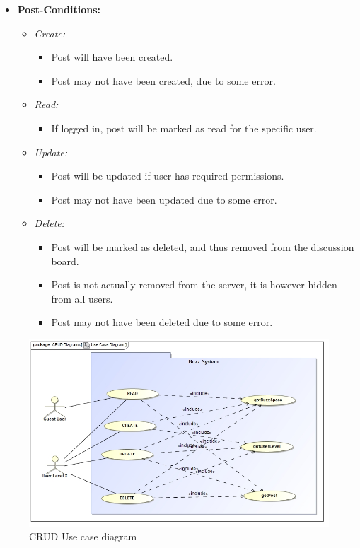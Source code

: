 \documentclass[11pt]{article}
\begin{document}
\begin{enumerate}
\begin{itemize}
\begin{itemize}
		\end{itemize}
		\item \textbf{Post-Conditions: }
		\begin{itemize}
		\item \textit{Create: }
			\begin{itemize}
			\item Post will have been created.
			\item Post may not have been created, due to some error.
			\end{itemize}
		\item \textit{Read: }
			\begin{itemize}
			\item If logged in, post will be marked as read for the 				specific user.
			\end{itemize}
		\item \textit{Update: }
			\begin{itemize}
			\item Post will be updated if user has required 						permissions.
			\item Post may not have been updated due to some error.
			\end{itemize}
		\item \textit{Delete: }
			\begin{itemize}
			\item Post will be marked as deleted, and thus removed 					from the discussion board.
			\item Post is not actually removed from the server, it is 					however hidden from all users.
		\item Post may not have been deleted due to some error. 
			\end{itemize}			
			
		\end{itemize}
	
	\end{itemize}
	
	\begin{figure}[H]	
    	\includegraphics[scale=0.5]{CRUD.jpg}
    	\caption{CRUD Use case diagram}
	\end{figure}
	

\end{enumerate}
\end{document}
